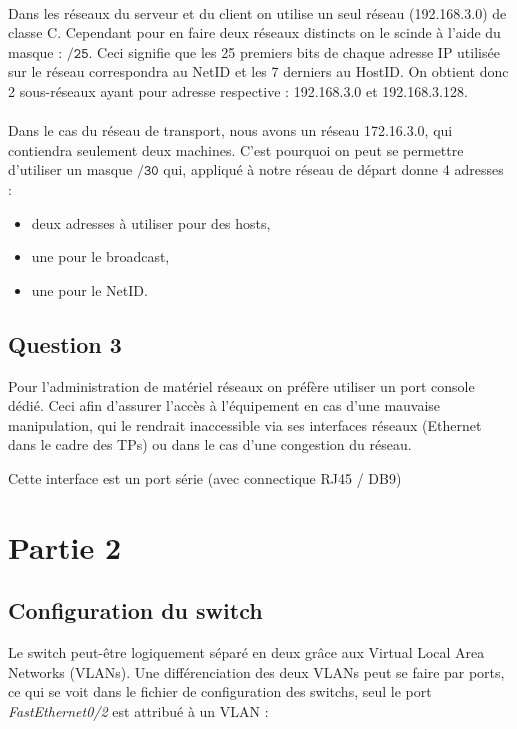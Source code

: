 \documentclass[12pt,a4paper,notitlepage]{article}
\begin{document}
\paragraph{}Dans les réseaux du serveur et du client on utilise un seul réseau (192.168.3.0) de classe C. Cependant pour en faire deux réseaux distincts on le scinde à l'aide du masque : $\mathtt{/25}$. Ceci signifie que les 25 premiers bits de chaque adresse IP utilisée sur le réseau correspondra au NetID et les 7 derniers au HostID. On obtient donc 2 sous-réseaux ayant pour adresse respective : 192.168.3.0 et 192.168.3.128.

\paragraph{}Dans le cas du réseau de transport, nous avons un réseau 172.16.3.0, qui contiendra seulement deux machines. C'est pourquoi on peut se permettre d'utiliser un masque $\mathtt{/30}$ qui, appliqué à notre réseau de départ donne 4 adresses : 
\begin{itemize}
\item deux adresses à utiliser pour des hosts,
\item une pour le broadcast,
\item une pour le NetID.
\end{itemize}


\subsection{Question 3}

Pour l'administration de matériel réseaux on préfère utiliser un port console dédié. Ceci afin d'assurer l'accès à l'équipement en cas d'une mauvaise manipulation, qui le rendrait inaccessible via ses interfaces réseaux (Ethernet dans le cadre des TPs) ou dans le cas d'une congestion du réseau.

Cette interface est un port série (avec connectique RJ45 / DB9) 


\section{Partie 2}
\subsection{Configuration du switch}

Le switch peut-être logiquement séparé en deux grâce aux Virtual Local Area Networks (VLANs). Une différenciation des deux VLANs peut se faire par ports, ce qui se voit dans le fichier de configuration des switchs, seul le port \textit{FastEthernet0/2} est attribué à un VLAN :
\end{document}
